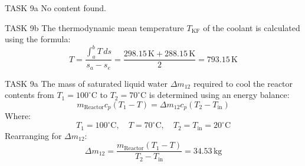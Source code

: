TASK 9a  
No content found.  

TASK 9b  
The thermodynamic mean temperature \( T_{\text{KF}} \) of the coolant is calculated using the formula:  
\[
T = \frac{\int_{a}^{b} T \, ds}{s_a - s_e} = \frac{298.15 \, \text{K} + 288.15 \, \text{K}}{2} = 793.15 \, \text{K}
\]  

TASK 9a  
The mass of saturated liquid water \( \Delta m_{12} \) required to cool the reactor contents from \( T_1 = 100^\circ\text{C} \) to \( T_2 = 70^\circ\text{C} \) is determined using an energy balance:  
\[
m_{\text{Reactor}} c_p (T_1 - T) = \Delta m_{12} c_p \left( T_2 - T_{\text{in}} \right)
\]  
Where:  
\[
T_1 = 100^\circ\text{C}, \quad T = 70^\circ\text{C}, \quad T_2 = T_{\text{in}} = 20^\circ\text{C}
\]  
Rearranging for \( \Delta m_{12} \):  
\[
\Delta m_{12} = \frac{m_{\text{Reactor}} (T_1 - T)}{T_2 - T_{\text{in}}} = 34.53 \, \text{kg}
\]